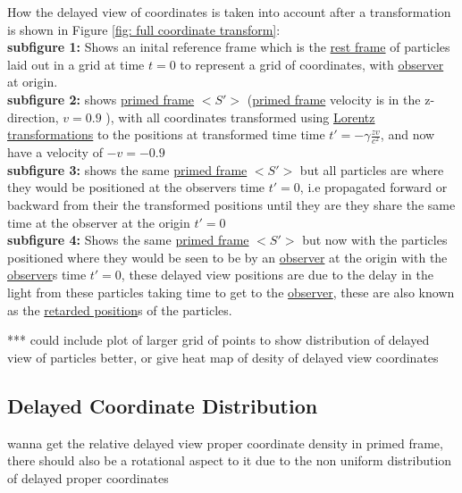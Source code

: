 How the delayed view of coordinates is taken into account after a transformation is shown in Figure \ref*{fig: full coordinate transform}: \\
\textbf{subfigure 1:} Shows an inital reference frame which is the \hyperlink{def-proper-frame}{rest frame} of particles laid out in a grid at time $t=0$ to represent a grid of coordinates, with \hyperlink{def-observer}{observer} at origin.\\
\textbf{subfigure 2:} shows \hyperlink{def-Primed-Frame}{primed frame} $<S'>$ (\hyperlink{def-Primed-Frame}{primed frame} velocity is in the z-direction, $v=0.9$ ), with all coordinates transformed using \hyperlink{def-lorentz-transform}{Lorentz transformations} to the positions at transformed time time $t'=-\gamma \frac{zv}{c^2}$, and now have a velocity of $-v=-0.9$ \\
\textbf{subfigure 3:} shows the same \hyperlink{def-Primed-Frame}{primed frame} $<S'>$ but all particles are where they would be positioned at the observers time $t'=0$, i.e propagated forward or backward from their the transformed positions until they are they share the same time at the observer at the origin $t'=0$ \\
\textbf{subfigure 4:} Shows the same \hyperlink{def-Primed-Frame}{primed frame} $<S'>$ but now with the particles positioned where they would be seen to be by an \hyperlink{def-observer}{observer} at the origin with the \hyperlink{def-observer}{observer}s time $t'=0$, these delayed view positions are due to the delay in the light from these particles taking time to get to the \hyperlink{def-observer}{observer}, these are also known as the \hyperlink{def-retarded-position}{retarded position}s of the particles.


*** could include plot of larger grid of points to show distribution of delayed view of particles better, or give heat map of desity of delayed view coordinates


\subsection{Delayed Coordinate Distribution}

wanna get the relative delayed view proper coordinate density in primed frame, there should also be a rotational aspect to it due to the non uniform distribution of delayed proper coordinates


